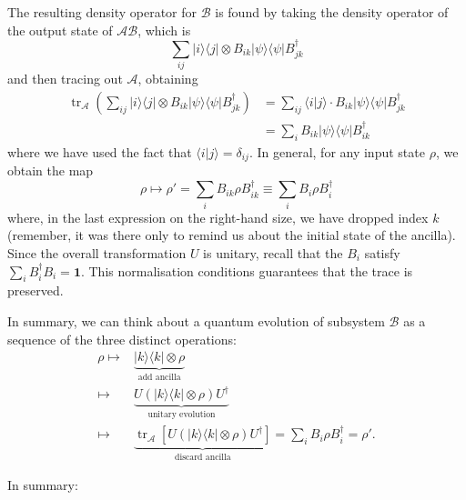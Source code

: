 \documentclass[fleqn]{article}
\newenvironment{idea}{\noindent}{\medskip}
\begin{document}
The resulting density operator for \(\mathcal{B}\) is found by taking the density operator of the output state of \(\mathcal{AB}\), which is
\[
  \sum_{ij} |i\rangle\langle j|\otimes B_{ik}|\psi\rangle\langle\psi|B_{jk}^\dagger
\]
and then tracing out \(\mathcal{A}\), obtaining
\[
  \begin{aligned}
    \operatorname{tr}_\mathcal{A} \left(
      \sum_{ij} |i\rangle\langle j|\otimes B_{ik}|\psi\rangle\langle\psi|B_{jk}^\dagger
    \right)
    &= \sum_{ij} \langle i|j\rangle\cdot B_{ik}|\psi\rangle\langle\psi|B_{jk}^\dagger
  \\&= \sum_i B_{ik}|\psi\rangle\langle\psi|B_{ik}^\dagger
  \end{aligned}
\]
where we have used the fact that \(\langle i|j\rangle=\delta_{ij}\).
In general, for any input state \(\rho\), we obtain the map
\[
  \rho\longmapsto
  \rho'= \sum_i B_{ik}\rho B^\dagger_{ik} \equiv \sum_i B_{i}\rho B^\dagger_{i}
\]
where, in the last expression on the right-hand size, we have dropped index \(k\) (remember, it was there only to remind us about the initial state of the ancilla).
Since the overall transformation \(U\) is unitary, recall that the \(B_i\) satisfy \(\sum_i B_i^\dagger B_i=\mathbf{1}\).
This normalisation conditions guarantees that the trace is preserved.

\begin{idea}
In summary, we can think about a quantum evolution of subsystem \(\mathcal{B}\) as a sequence of the three distinct operations:
\[
  \begin{aligned}
    \rho
    \longmapsto &\underbrace{|k\rangle\langle k|\otimes\rho}_{\text{add ancilla}}
  \\\longmapsto &\underbrace{U(|k\rangle\langle k|\otimes\rho) U^\dagger}_{\text{unitary evolution}}
  \\\longmapsto &\underbrace{\operatorname{tr}_\mathcal{A} \left[U(|k\rangle\langle k|\otimes\rho) U^\dagger\right]}_{\text{discard ancilla}}
    = \sum_i B_{i}\rho B_{i}^\dagger
    =\rho'.
  \end{aligned}
\]

\end{idea}

In summary:
\end{document}
